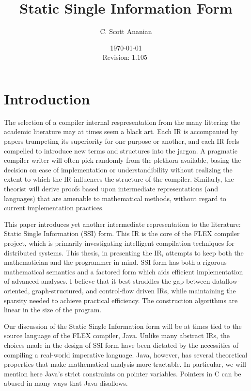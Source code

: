 \documentclass[12pt,titlepage,twoside]{article}
\title{Static Single Information Form
}
\author{C. Scott Ananian}
\date{\today \\ $ $Revision: 1.105 $ $}
\let\oldsection\section
\renewcommand{\section}{\setcounter{figure}{0}\setcounter{table}{0}\oldsection}
\begin{document}


\pagestyle{empty}
\maketitle\cleardoublepage
\pagestyle{myheadings}
\tableofcontents\listoffigures\listoftables\listofalgorithms\cleardoublepage
{}

\section{Introduction}
The selection of a compiler internal respresentation from the many
littering the academic literature may at times seem a black art.  Each
IR is accompanied by papers trumpeting its superiority for one purpose
or another, and each IR feels compelled to introduce new terms and
structures into the jargon.  A pragmatic compiler writer will often
pick randomly from the plethora available, basing the decision on ease
of implementation or understandibility without realizing the extent to
which the IR influences the structure of the compiler.  Similarly, the
theorist will derive proofs based upon intermediate representations
(and languages) that are amenable to mathematical methods, without
regard to current implementation practices.%

This paper introduces yet another intermediate
representation to the literature:  Static Single Information (SSI) form.
This IR is the core of the FLEX compiler project, which is primarily
investigating intelligent compilation techniques for distributed
systems.  This thesis, in presenting the IR,
attempts to keep both the mathematician and the programmer in mind.  
SSI form has both a rigorous mathematical semantics and a factored
form which aids efficient implementation of advanced analyses.
I believe that it best straddles the gap between dataflow-oriented,
graph-structured, and control-flow driven IRs, while maintaining the
sparsity needed to achieve practical efficiency.  The construction
algorithms are linear in the size of the program.

Our discussion of the Static Single Information form will be at times
tied to the source language of the FLEX compiler, Java.  Unlike many
abstract IRs, the choices made in the design of SSI form have been
dictated by the necessities of compiling a real-world imperative
language.  Java, however, has several theoretical properties that make
mathematical analysis more tractable.  In particular, we
will mention here Java's strict constraints on pointer variables.
Pointers in C can be abused in many ways that Java disallows.
\end{document}
